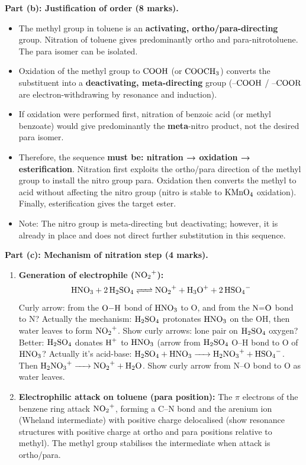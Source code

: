 \documentclass[11pt]{article}
\begin{document}
\begin{corrige}
\textbf{Part (b): Justification of order (8 marks).}
\begin{itemize}
\item The methyl group in toluene is an \textbf{activating, ortho/para-directing} group. Nitration of toluene gives predominantly ortho and para-nitrotoluene. The para isomer can be isolated.
\item Oxidation of the methyl group to \(\ce{COOH}\) (or \(\ce{COOCH3}\)) converts the substituent into a \textbf{deactivating, meta-directing} group (–\(\ce{COOH}\) / –\(\ce{COOR}\) are electron-withdrawing by resonance and induction).
\item If oxidation were performed first, nitration of benzoic acid (or methyl benzoate) would give predominantly the \textbf{meta}-nitro product, not the desired para isomer.
\item Therefore, the sequence \textbf{must be: nitration → oxidation → esterification}. Nitration first exploits the ortho/para direction of the methyl group to install the nitro group para. Oxidation then converts the methyl to acid without affecting the nitro group (nitro is stable to \(\ce{KMnO4}\) oxidation). Finally, esterification gives the target ester.
\item Note: The nitro group is meta-directing but deactivating; however, it is already in place and does not direct further substitution in this sequence.
\end{itemize}

\textbf{Part (c): Mechanism of nitration step (4 marks).}
\begin{enumerate}
\item \textbf{Generation of electrophile (\(\ce{NO2+}\)):}
\[
\ce{HNO3 + 2H2SO4 <=> NO2+ + H3O+ + 2HSO4-}
\]
Curly arrow: from the \(\ce{O-H}\) bond of \(\ce{HNO3}\) to O, and from the \(\ce{N=O}\) bond to N? Actually the mechanism: \(\ce{H2SO4}\) protonates \(\ce{HNO3}\) on the OH, then water leaves to form \(\ce{NO2+}\). Show curly arrows: lone pair on \(\ce{H2SO4}\) oxygen? Better: \(\ce{H2SO4}\) donates \(\ce{H+}\) to \(\ce{HNO3}\) (arrow from \(\ce{H2SO4}\) O–H bond to O of \(\ce{HNO3}\)? Actually it's acid-base: \(\ce{H2SO4 + HNO3 -> H2NO3+ + HSO4-}\). Then \(\ce{H2NO3+ -> NO2+ + H2O}\). Show curly arrow from N–O bond to O as water leaves.

\item \textbf{Electrophilic attack on toluene (para position):}
The \(\pi\) electrons of the benzene ring attack \(\ce{NO2+}\), forming a C–N bond and the arenium ion (Wheland intermediate) with positive charge delocalised (show resonance structures with positive charge at ortho and para positions relative to methyl). The methyl group stabilises the intermediate when attack is ortho/para.


\end{enumerate}
\end{corrige}
\end{document}
